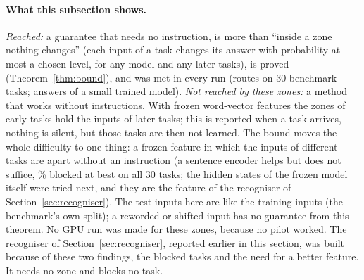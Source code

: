 \paragraph{What this subsection shows.} \emph{Reached:} a guarantee that needs no instruction, is more than ``inside a zone nothing changes'' (each input of a task changes its answer with probability at most a chosen level, for any model and any later tasks), is proved (Theorem~\ref{thm:bound}), and was met in every run (routes on 30 benchmark tasks; answers of a small trained model).
\emph{Not reached by these zones:} a method that works without instructions. With frozen word-vector features the zones of early tasks hold the inputs of later tasks; this is reported when a task arrives, nothing is silent, but those tasks are then not learned. The bound moves the whole difficulty to one thing: a frozen feature in which the inputs of different tasks are apart without an instruction (a sentence encoder helps but does not suffice, \BoundBothMiniRatioFiveBlocked{}\% blocked at best on all 30 tasks; the hidden states of the frozen model itself were tried next, and they are the feature of the recogniser of Section~\ref{sec:recogniser}). The test inputs here are like the training inputs (the benchmark's own split); a reworded or shifted input has no guarantee from this theorem. No GPU run was made for these zones, because no pilot worked.
The recogniser of Section~\ref{sec:recogniser}, reported earlier in this section, was built because of these two findings, the blocked tasks and the need for a better feature. It needs no zone and blocks no task.
